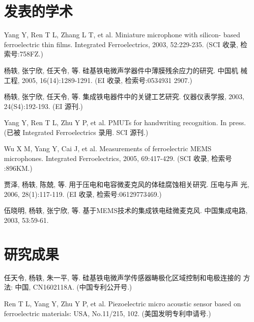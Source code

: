 \begin{resume}

  \section*{发表的学术} %

  \begin{enumerate}[{[}1{]}]
  \addtolength{\itemsep}{-.36\baselineskip}%
  \item Yang Y, Ren T L, Zhang L T, et al. Miniature microphone with silicon-
    based ferroelectric thin films. Integrated Ferroelectrics, 2003,
    52:229-235. (SCI 收录, 检索号:758FZ.)
  \item 杨轶, 张宁欣, 任天令, 等. 硅基铁电微声学器件中薄膜残余应力的研究. 中国机
    械工程, 2005, 16(14):1289-1291. (EI 收录, 检索号:0534931 2907.)
  \item 杨轶, 张宁欣, 任天令, 等. 集成铁电器件中的关键工艺研究. 仪器仪表学报,
    2003, 24(S4):192-193. (EI 源刊.)
  \item Yang Y, Ren T L, Zhu Y P, et al. PMUTs for handwriting recognition. In
    press. (已被 Integrated Ferroelectrics 录用. SCI 源刊.)
  \item Wu X M, Yang Y, Cai J, et al. Measurements of ferroelectric MEMS
    microphones. Integrated Ferroelectrics, 2005, 69:417-429. (SCI 收录, 检索号
    :896KM.)
  \item 贾泽, 杨轶, 陈兢, 等. 用于压电和电容微麦克风的体硅腐蚀相关研究. 压电与声
    光, 2006, 28(1):117-119. (EI 收录, 检索号:06129773469.)
  \item 伍晓明, 杨轶, 张宁欣, 等. 基于MEMS技术的集成铁电硅微麦克风. 中国集成电路, 
    2003, 53:59-61.
  \end{enumerate}

  \section*{研究成果} %
  \begin{enumerate}[{[}1{]}]
  \addtolength{\itemsep}{-.36\baselineskip}%
  \item 任天令, 杨轶, 朱一平, 等. 硅基铁电微声学传感器畴极化区域控制和电极连接的
    方法: 中国, CN1602118A. (中国专利公开号.)
  \item Ren T L, Yang Y, Zhu Y P, et al. Piezoelectric micro acoustic sensor
    based on ferroelectric materials: USA, No.11/215, 102. (美国发明专利申请号.)
  \end{enumerate}
\end{resume}
